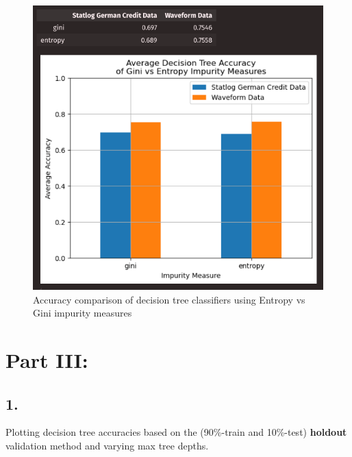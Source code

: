 \documentclass{article}
\begin{document}
    \begin{figure}[H]
        \centering
        \includegraphics[width=\textwidth, height=0.6\textheight]{2comparison.png}
        \caption{Accuracy comparison of decision tree classifiers using Entropy vs Gini impurity measures}
    \end{figure}

    \newpage

    \section*{Part III:}

    \subsection*{1.}

    Plotting decision tree accuracies based on the (90\%-train and 10\%-test) \textbf{holdout} validation method and varying max tree depths.
\end{document}
